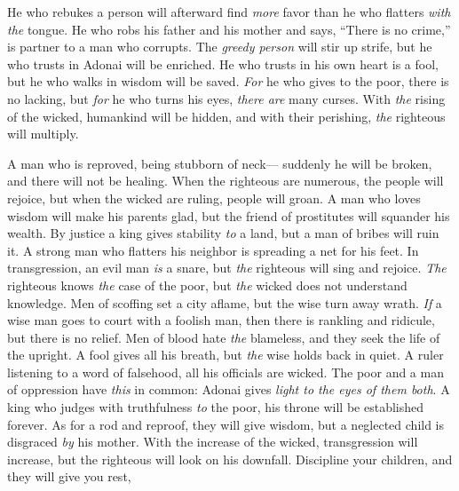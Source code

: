 \begin{biblechapter}
\verse He who rebukes a person will afterward find \textit{more} favor 
than he who flatters \textit{with the} tongue.
\verse He who robs his father and his mother and says, “There is no crime,” 
is partner to a man who corrupts.
\verse The \textit{greedy person} will stir up strife, 
but he who trusts in Adonai will be enriched.
\verse He who trusts in his own heart is a fool, 
but he who walks in wisdom will be saved.
\verse \textit{For} he who gives to the poor, there is no lacking, 
but \textit{for} he who turns his eyes, \textit{there are} many curses.
\verse With \textit{the} rising of the wicked, humankind will be hidden, 
and with their perishing, \textit{the} righteous will multiply.
\end{biblechapter}

\begin{biblechapter} %
\verse A man who is reproved, being stubborn of neck— 
suddenly he will be broken, and there will not be healing.
\verse When the righteous are numerous, the people will rejoice, 
but when the wicked are ruling, people will groan.
\verse A man who loves wisdom will make his parents glad, 
but the friend of prostitutes will squander his wealth.
\verse By justice a king gives stability \textit{to} a land, 
but a man of bribes will ruin it.
\verse A strong man who flatters his neighbor 
is spreading a net for his feet.
\verse In transgression, an evil man \textit{is} a snare, 
but \textit{the} righteous will sing and rejoice.
\verse \textit{The} righteous knows \textit{the} case of the poor, 
but \textit{the} wicked does not understand knowledge.
\verse Men of scoffing set a city aflame, 
but the wise turn away wrath.
\verse \textit{If} a wise man goes to court with a foolish man, 
then there is rankling and ridicule, but there is no relief.
\verse Men of blood hate \textit{the} blameless, 
and they seek the life of the upright.
\verse A fool gives all his breath, 
but \textit{the} wise holds back in quiet.
\verse A ruler listening to a word of falsehood, 
all his officials are wicked.
\verse The poor and a man of oppression have \textit{this} in common: 
Adonai gives \textit{light to the eyes of them both}.
\verse A king who judges with truthfulness \textit{to} the poor, 
his throne will be established forever.
\verse As for a rod and reproof, they will give wisdom, 
but a neglected child is disgraced \textit{by} his mother.
\verse With the increase of the wicked, transgression will increase, 
but the righteous will look on his downfall.
\verse Discipline your children, and they will give you rest, 

\end{biblechapter}
